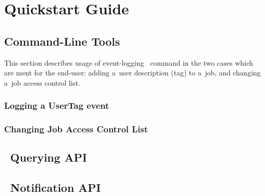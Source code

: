 \section{Quickstart Guide}

\subsection{Command-Line Tools}
This section describes usage of event-logging \LB\ command in the two
cases which are ment for the end-user: adding a~user description (tag)
to a~job, and changing a~job access control list.

\subsubsection{Logging a UserTag event}
\label{log_usertag}


\subsubsection{Changing Job Access Control List}
\label{change_acl}





\subsection{\LB\ Querying API}



\subsection{\LB\ Notification API}



\endinput

